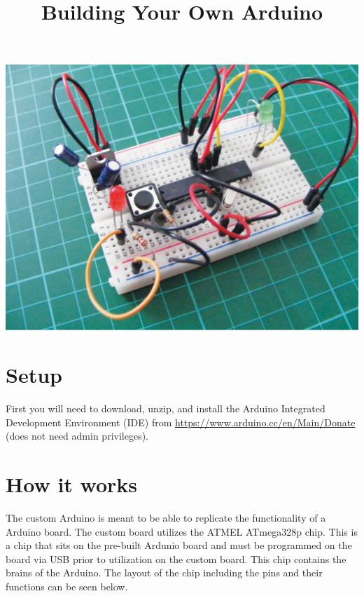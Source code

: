 \documentclass[11pt]{article}
\date{}
\title{Building Your Own Arduino}
\begin{document}
\maketitle
	
\centerline{
	\includegraphics[scale=.55]{exp10-board}	
}

\section{Setup}
\label{sec-1}

First you will need to download, unzip, and install the Arduino Integrated Development Environment (IDE) from
\url{https://www.arduino.cc/en/Main/Donate} (does not need admin privileges).

\section{How it works}
\label{sec-2}
The custom Arduino is meant to be able to replicate the functionality of a Arduino board. The custom board utilizes the ATMEL ATmega328p chip. This is a chip that sits on the pre-built Ardunio board and must be programmed on the board via USB prior to utilization on the custom board. This chip contains the brains of the Arduino. The layout of the chip including the pins and their functions can be seen below. 
\end{document}
